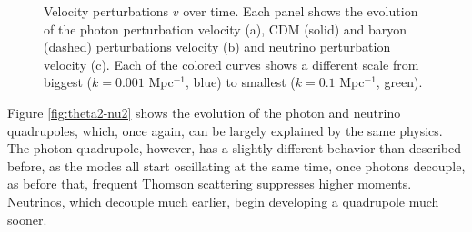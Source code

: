 \documentclass{aa}
\begin{document}
\begin{figure}[ht]
  \centering
  \quad
  \quad
\caption{Velocity perturbations $v$ over time. Each panel shows the evolution of the photon perturbation velocity (a), CDM (solid) and baryon (dashed) perturbations velocity (b) and neutrino perturbation velocity (c). Each of the colored curves shows a different scale from biggest ($k = 0.001$ Mpc$^{-1}$, blue) to smallest ($k=0.1$ Mpc$^{-1}$, green).}
\label{fig:velocities}
\end{figure}

Figure \ref{fig:theta2-nu2} shows the evolution of the photon and neutrino quadrupoles, which, once again, can be largely explained by the same physics. The photon quadrupole, however, has a slightly different behavior than described before, as the modes all start oscillating at the same time, once photons decouple, as before that, frequent Thomson scattering suppresses higher moments. Neutrinos, which decouple much earlier, begin developing a quadrupole much sooner.
\end{document}
